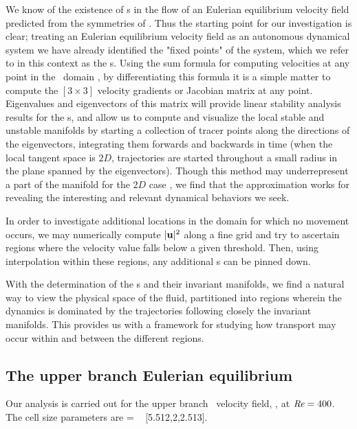 \documentclass[lineno]{jfm}
\begin{document}
We know of the existence of  \stagp s in the flow of an Eulerian equilibrium 
velocity field predicted from the symmetries of \pCf. Thus the starting 
point for our investigation is clear; treating an Eulerian equilibrium velocity 
field as an autonomous dynamical system we have already identified the 
"fixed points" of the system, which we refer to in this context as the 
\stagp s.  Using the sum formula for computing velocities at any point in 
the \pCf\ domain , by differentiating this formula 
it is a simple matter to compute the $[3\!\times\! 3]$ velocity gradients 
or Jacobian matrix at any point. Eigenvalues and eigenvectors of this 
matrix will provide linear stability analysis results for the {\stagp}s, 
and allow us to compute and visualize the local stable and unstable 
manifolds by starting a collection of tracer points along the directions 
of the eigenvectors, integrating them forwards and backwards in time 
(when the local tangent space is $2D$, trajectories are started 
throughout a small radius in the plane spanned by the eigenvectors). 
Though this method may underrepresent a part of the manifold for the $2D$ 
case \citep{SahVla09}, we find that the approximation works for revealing 
the interesting and relevant dynamical behaviors we seek. 

In order to investigate additional locations in the domain for which no 
movement occurs, we may numerically compute $|{\bf u}|^{2}$ along a fine grid 
and try to ascertain regions where the velocity value falls below a given 
threshold. Then, using interpolation within these regions, any additional  
\stagp s can be pinned down. 

With the determination of the {\stagp}s and their invariant manifolds, we 
find a natural way to view the physical space of the fluid, partitioned 
into regions wherein the dynamics is dominated by the trajectories 
following closely the invariant manifolds. This provides us with a 
framework for studying how transport may occur within and between the 
different regions. 

\subsection{The upper branch Eulerian equilibrium}
\label{s:eq2}

Our analysis is carried out for the upper branch \eqv\ velocity field, 
{\tEQtwo}, at $\textit{Re} = 400$. 
The cell size parameters are 
\beq   
[L_x,2,L_z]
         = \; [2\pi/1.14,2,4\pi/5]
         ~ [5.512,2,2.513].
\end{document}
